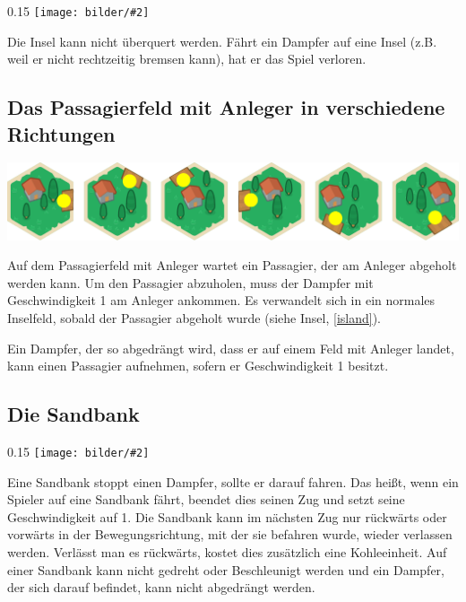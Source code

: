 \documentclass[12pt,a4paper, ngerman, oneside]{scrartcl}
\newcommand{\fieldGraphic}[2]{%
\begin{floatingfigure}[#1]{0.15\textwidth}%
  \centering
  \texttt{[image: bilder/\#2]}%
\end{floatingfigure}%
}
\begin{document}
\fieldGraphic{r}{insel}

Die Insel kann nicht überquert werden. Fährt ein Dampfer auf eine Insel (z.B.
weil er nicht rechtzeitig bremsen kann), hat er das Spiel verloren.

\paragraph{}

\subsection{\label{passenger}Das Passagierfeld mit Anleger in verschiedene Richtungen}

\includegraphics[width=\textwidth]{bilder/passagier}

Auf dem Passagierfeld mit Anleger wartet ein Passagier, der am Anleger abgeholt
werden kann. Um den Passagier abzuholen, muss der Dampfer mit Geschwindigkeit 1
am Anleger ankommen. Es verwandelt sich in ein normales Inselfeld, sobald der
Passagier abgeholt wurde (siehe Insel, \ref{island}).

Ein Dampfer, der so abgedrängt wird, dass er auf einem Feld mit Anleger landet,
kann einen Passagier aufnehmen, sofern er Geschwindigkeit 1 besitzt.


\subsection{\label{sandbank}Die Sandbank}

\fieldGraphic{r}{sandbank}

Eine Sandbank stoppt einen Dampfer, sollte er darauf fahren. Das heißt, wenn ein
Spieler auf eine Sandbank fährt, beendet dies seinen Zug und setzt seine
Geschwindigkeit auf 1. Die Sandbank kann im nächsten Zug nur rückwärts oder
vorwärts in der Bewegungsrichtung, mit der sie befahren wurde, wieder verlassen
werden. Verlässt man es rückwärts, kostet dies zusätzlich eine Kohleeinheit. Auf
einer Sandbank kann nicht gedreht oder Beschleunigt werden und ein Dampfer, der
sich darauf befindet, kann nicht abgedrängt werden.

\paragraph{}
\end{document}
